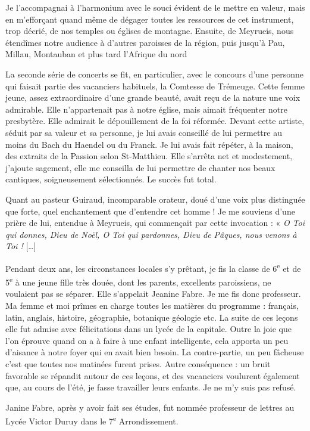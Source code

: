 Je l’accompagnai à l’harmonium avec le souci évident de le mettre en valeur, mais en
m’efforçant quand même de dégager toutes les ressources de cet instrument, trop
décrié, de nos temples ou églises de montagne. Ensuite, de Meyrueis, nous étendîmes
notre audience à d’autres paroisses de la région, puis jusqu’à Pau, Millau, Montauban
et plus tard l’Afrique du nord

La seconde série de concerts se fit, en particulier, avec le concours d’une personne
qui faisait partie des vacanciers habituels, la Comtesse de Trémeuge. Cette femme
jeune, assez extraordinaire d’une grande beauté, avait reçu de la nature une voix
admirable. Elle n’appartenait pas à notre église, mais aimait fréquenter notre
presbytère. Elle admirait le dépouillement de la foi réformée. Devant cette artiste,
séduit par sa valeur et sa personne, je lui avais conseillé de lui permettre au moins du Bach du
Haendel ou du Franck. Je lui avais fait répéter, à la maison, des extraits de la Passion
selon St-Matthieu. Elle s’arrêta net et modestement, j’ajoute sagement, elle me
conseilla de lui permettre de chanter nos beaux cantiques, soigneusement
sélectionnés. Le succès fut total.

Quant au pasteur Guiraud, incomparable orateur, doué d’une voix plus distinguée que
forte, quel enchantement que d’entendre cet homme ! Je me souviens d’une prière de
lui, entendue à Meyrueis, qui commençait par cette invocation : « \emph{O Toi qui donnes,
Dieu de Noël, O Toi qui pardonnes, Dieu de Pâques, nous venons à Toi !} [\ldots]

Pendant deux ans, les circonstances locales s’y prêtant, je fis la classe de 6\textsuperscript{e} et de 5\textsuperscript{e} à
une jeune fille très douée, dont les parents, excellents paroissiens, ne voulaient pas se
séparer. Elle s’appelait Jeanine Fabre.
Je me fis donc professeur. Ma femme et moi prîmes en charge toutes les matières du
programme : français, latin, anglais, histoire, géographie, botanique géologie etc. La
suite de ces leçons elle fut admise avec félicitations dans un lycée de la capitale. Outre
la joie que l’on éprouve quand on a à faire à une enfant intelligente, cela apporta un
peu d’aisance à notre foyer qui en avait bien besoin. La contre-partie, un peu fâcheuse
c’est que toutes nos matinées furent prises. Autre conséquence : un bruit favorable se
répandit autour de ces leçons, et des vacanciers voulurent également que, au cours de
l’été, je fasse travailler leurs enfants. Je ne m’y suis pas refusé.

Janine Fabre, après y avoir fait ses études, fut nommée professeur de lettres au Lycée
Victor Duruy dans le 7\textsuperscript{e} Arrondissement.

